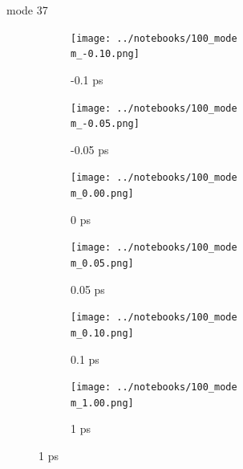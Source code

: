 \documentclass{beamer}
\begin{document}
\renewcommand\m{37}
\begin{frame}{mode \m}
	\begin{figure}
		\centering
		\begin{subfigure}[b]{\w\textwidth}
			\centering
			\texttt{[image: ../notebooks/100\_mode\\m\_-0.10.png]}
			\caption{-0.1 ps}
		\end{subfigure}
		\begin{subfigure}[b]{\w\textwidth}
			\centering
			\texttt{[image: ../notebooks/100\_mode\\m\_-0.05.png]}
			\caption{-0.05 ps}
		\end{subfigure}
		\begin{subfigure}[b]{\w\textwidth}
			\centering
			\texttt{[image: ../notebooks/100\_mode\\m\_0.00.png]}
			\caption{0 ps}
		\end{subfigure}
		\begin{subfigure}[b]{\w\textwidth}
			\centering
			\texttt{[image: ../notebooks/100\_mode\\m\_0.05.png]}
			\caption{0.05 ps}
		\end{subfigure}
		\begin{subfigure}[b]{\w\textwidth}
			\centering
			\texttt{[image: ../notebooks/100\_mode\\m\_0.10.png]}
			\caption{0.1 ps}
		\end{subfigure}
		\begin{subfigure}[b]{\w\textwidth}
			\centering
			\texttt{[image: ../notebooks/100\_mode\\m\_1.00.png]}
			\caption{1 ps}
		\end{subfigure}
	\end{figure}
\end{frame}
\end{document}

